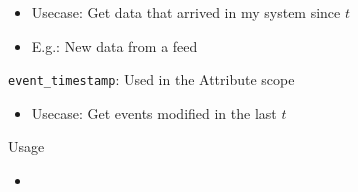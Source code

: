 \begin{multicols*}{2}
{\begin{description}[noitemsep,topsep=2pt,parsep=0pt,partopsep=0pt]
\begin{itemize}[noitemsep,topsep=2pt,parsep=0pt,partopsep=0pt]
                \item Usecase: Get data that arrived in my system since $t$
                \item E.g.: New data from a feed
            \end{itemize}
            \item \texttt{event\_timestamp}: Used in the Attribute scope
                \begin{itemize}[noitemsep,topsep=2pt,parsep=0pt,partopsep=0pt]
                    \item Usecase: Get events modified in the last $t$
                \end{itemize}
            \item Usage
            \begin{itemize}[noitemsep,topsep=2pt,parsep=0pt,partopsep=0pt]
                \item[] \usebox\codeboxD
            \end{itemize}
        \end{description}
    }



\end{multicols*}
